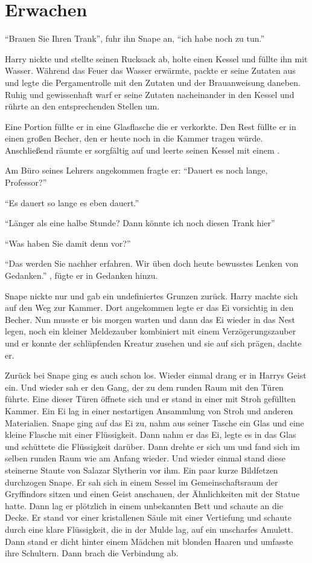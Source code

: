 \chapter{Erwachen}


\enquote{Brauen Sie Ihren Trank}, fuhr ihn Snape an, \enquote{ich habe noch zu tun.}

Harry nickte und stellte seinen Rucksack ab, holte einen Kessel und füllte ihn mit Wasser. Während das Feuer das Wasser erwärmte, packte er seine Zutaten aus und legte die Pergamentrolle mit den Zutaten und der Brauanweisung daneben. Ruhig und gewissenhaft warf er seine Zutaten nacheinander in den Kessel und rührte an den entsprechenden Stellen um.

Eine Portion füllte er in eine Glasflasche die er verkorkte. Den Rest füllte er in einen großen Becher, den er heute noch in die Kammer tragen würde. Anschließend räumte er sorgfältig auf und leerte seinen Kessel mit einem .

Am Büro seines Lehrers angekommen fragte er: \enquote{Dauert es noch lange, Professor?}

\enquote{Es dauert so lange es eben dauert.}

\enquote{Länger als eine halbe Stunde? Dann könnte ich noch diesen Trank hier\abs}

\enquote{Was haben Sie damit denn vor?}

\enquote{Das werden Sie nachher erfahren. Wir üben doch heute bewusstes Lenken von Gedanken.} , fügte er in Gedanken hinzu.

Snape nickte nur und gab ein undefiniertes Grunzen zurück. Harry machte sich auf den Weg zur Kammer. Dort angekommen legte er das Ei vorsichtig in den Becher. Nun musste er bis morgen warten und dann das Ei wieder in das Nest legen, noch ein kleiner Meldezauber kombiniert mit einem Verzögerungszauber und er konnte der schlüpfenden Kreatur zusehen und sie auf sich prägen, dachte er.

Zurück bei Snape ging es auch schon los. Wieder einmal drang er in Harrys Geist ein. Und wieder sah er den Gang, der zu dem runden Raum mit den Türen führte. Eine dieser Türen öffnete sich und er stand in einer mit Stroh gefüllten Kammer. Ein Ei lag in einer nestartigen Ansammlung von Stroh und anderen Materialien. Snape ging auf das Ei zu, nahm aus seiner Tasche ein Glas und eine kleine Flasche mit einer Flüssigkeit. Dann nahm er das Ei, legte es in das Glas und schüttete die Flüssigkeit darüber. Dann drehte er sich um und fand sich im selben runden Raum wie am Anfang wieder. Und wieder einmal stand diese steinerne Staute von Salazar Slytherin vor ihm. Ein paar kurze Bildfetzen durchzogen Snape. Er sah sich in einem Sessel im Gemeinschaftsraum der Gryffindors sitzen und einen Geist anschauen, der Ähnlichkeiten mit der Statue hatte. Dann lag er plötzlich in einem unbekannten Bett und schaute an die Decke. Er stand vor einer kristallenen Säule mit einer Vertiefung und schaute durch eine klare Flüssigkeit, die in der Mulde lag, auf ein unscharfes Amulett. Dann stand er dicht hinter einem Mädchen mit blonden Haaren und umfasste ihre Schultern. Dann brach die Verbindung ab.

